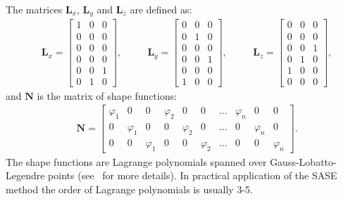 \documentclass[preprint,12pt]{elsarticle}
\newcommand{\matr}[1]{\mathbf{#1}} %
\begin{document}
	 The matrices $ \matr{L}_x $,  $ \matr{L}_y $ and  $ \matr{L}_z $ are defined as:
	 \begin{equation}
	 \begin{split}
		 & \matr{L}_x = \left[\begin{array}{ccc} 
		 1 & 0 & 0  \\[4pt]
		 0&0&0\\[4pt]
		 0 &0&0  \\[4pt]
		 0&0&0\\[4pt]
		 0&0&1\\[4pt]
		  0&1&0 
		 \end{array} \right], 
	 \end{split} \quad 
	  \begin{split}
		  & \matr{L}_y = \left[\begin{array}{ccc} 
		 0&0&0\\[4pt]
		 0&1&0\\[4pt]
		 0 &0&0\\[4pt]
		 0&0&1\\[4pt]
		 0&0&0\\[4pt]
		 1&0&0 
		 \end{array} \right],
	 \end{split} \quad 
	 \begin{split}
	& \matr{L}_z = \left[\begin{array}{ccc} 
	0&0&0\\[4pt]
	0&0&0\\[4pt]
	0 &0&1\\[4pt]
	0&1&0\\[4pt]
	1&0&0\\[4pt]
	0&0&0 
	\end{array} \right],
	\end{split}
	 \label{eq:selectors}
	 \end{equation} 
	 and $\matr{N}$ is the matrix of shape functions:
	  \begin{equation}
	 \begin{split}
	 & \matr{N} = \left[\begin{array}{cccccccccc} 
	 \varphi_1 & 0 & 0  & \varphi_2 & 0 & 0& \ldots & \varphi_n & 0 & 0\\[4pt]
	 0&\varphi_1&0 &  0&\varphi_2&0 & \ldots&  0&\varphi_n&0\\[4pt]
	 0 &0&\varphi_1 & 0 &0&\varphi_2 & \ldots& 0 &0&\varphi_n 
	 \end{array} \right]. 
	 \end{split}
	 \end{equation}
	 The shape functions are Lagrange polynomials spanned over Gauss-Lobatto-Legendre points (see~\cite{Kudela2007} for more details). In practical application of the SASE method the order of Lagrange polynomials is usually 3-5.
	 
\end{document}
